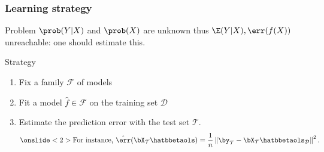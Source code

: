 \documentclass{beamer}\usepackage[]{graphicx}\usepackage[]{color}
\begin{document}
\begin{frame}
  \frametitle{Learning strategy}

  \begin{block}{Problem}
    $\prob(Y|X)$  and  $\prob(X)$   are  unknown  thus  $\E(Y|X),  \err(f(X))$
  unreachable: one should \alert{estimate} this.
  \end{block}

  \vfill

  \begin{block}{Strategy}
    \begin{enumerate}
    \item  Fix a family $\mathcal{F}$ of models\\
      \bigskip
    \item Fit a model $\hat{f}\in\mathcal{F}$ on the training set $\mathcal{D}$\\ 
      \bigskip
    \item Estimate the prediction error with the test set $\mathcal{T}$.
       \begin{equation*}
         \onslide<2>{\text{For instance, }\hat{\err}(\bX_{\mathcal{T}}\hatbbetaols) = \frac{1}{n} \left\|
         \by_{\mathcal{T}}- \bX_{\mathcal{T}} \hatbbetaols_{\mathcal{D}}\right\|^2.}
       \end{equation*}
    \end{enumerate}
  \end{block}
\end{frame}
\end{document}
